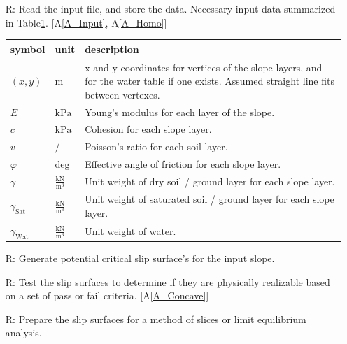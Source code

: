 \documentclass[12pt]{article}
\newcommand{\aref}[1]{A\ref{#1}}
\renewcommand{\arraystretch}{1}
\newcounter{reqnum} %
\newcounter{tablenum} %
\newcommand{\tableref}[1]{Table\ref{#1}}
\begin{document}
\noindent \begin{itemize}

\item[R\refstepcounter{reqnum}\thereqnum \label{R_Inputs}:] Read the
  input file, and store the data. Necessary input data summarized in
  \tableref{Table:Inputs}. [\aref{A_Input}, \aref{A_Homo}]
  
  \renewcommand{\arraystretch}{1.5}
  \noindent \begin{longtable}{l l p{12cm}} \toprule \textbf{symbol} &
    {tablenum}  \label{Table:Inputs}
    \textbf{unit} & \textbf{description}\\ \midrule
    $\left(x,y\right)$ & $\text{m}$ & x and y coordinates for vertices
    of the slope layers, and for the water table if one exists.
    Assumed straight line fits between vertexes.\\
    $E$ & $\text{kPa}$ & Young's modulus for each layer of the
    slope.\\
    $c$ & $\text{kPa}$ & Cohesion for each slope layer. \\
    $v$ & $ / $ & Poisson's ratio for each soil layer. \\
    $\varphi$ & $\text{deg}$ & Effective angle of friction for each
    slope layer. \\
    $\gamma$ & $\frac{\text{kN}}{\text{m}^3}$ & Unit weight of dry
    soil / ground layer for each slope layer. \\
    $\gamma_{\text{Sat}}$ & $\frac{\text{kN}}{\text{m}^3}$ & Unit
    weight of saturated soil / ground layer for each slope
    layer. \\
    $\gamma_{\text{Wat}}$ & $\frac{\text{kN}}{\text{m}^3}$ & Unit
    weight of water. \\ \bottomrule
\end{longtable}

\item[R\refstepcounter{reqnum}\thereqnum \label{R_InitGen}:] Generate
  potential critical slip surface's for the input slope. 

\item[R\refstepcounter{reqnum}\thereqnum \label{R_KinAdm}:] Test the
  slip surfaces to determine if they are physically realizable based
  on a set of pass or fail criteria. [\aref{A_Concave}]

\item[R\refstepcounter{reqnum}\thereqnum \label{R_Slice}:] Prepare the
  slip surfaces for a method of slices or limit equilibrium analysis.


\end{itemize}
\end{document}
